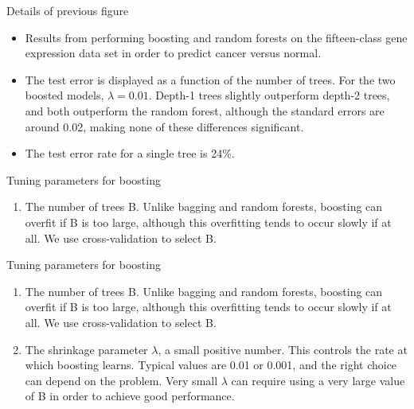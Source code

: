 \documentclass[aspectratio=169, 11pt]{beamer}
\begin{document}
\begin{frame}{Details of previous figure}
\begin{itemize}
    \item Results from performing boosting and random forests on the fifteen-class gene expression data set in order to predict cancer versus normal.
    \item The test error is displayed as a function of the number of trees. For the two boosted models, $\lambda=0.01$. Depth-1 trees slightly outperform depth-2 trees, and both outperform the random forest, although the standard errors are around 0.02, making none of these differences significant.
    \item The test error rate for a single tree is 24\%.
\end{itemize}
\end{frame}

\begin{frame}{Tuning parameters for boosting}
\begin{enumerate}
    \item The number of trees B. Unlike bagging and random forests, boosting can overfit if B is too large, although this overfitting tends to occur slowly if at all. We use cross-validation to select B.
\end{enumerate}
\end{frame}

\begin{frame}{Tuning parameters for boosting}
\begin{enumerate}
    \item The number of trees B. Unlike bagging and random forests, boosting can overfit if B is too large, although this overfitting tends to occur slowly if at all. We use cross-validation to select B.
    \item The shrinkage parameter $\lambda$, a small positive number. This controls the rate at which boosting learns. Typical values are 0.01 or 0.001, and the right choice can depend on the problem. Very small $\lambda$ can require using a very large value of B in order to achieve good performance.
\end{enumerate}
\end{frame}
\end{document}
